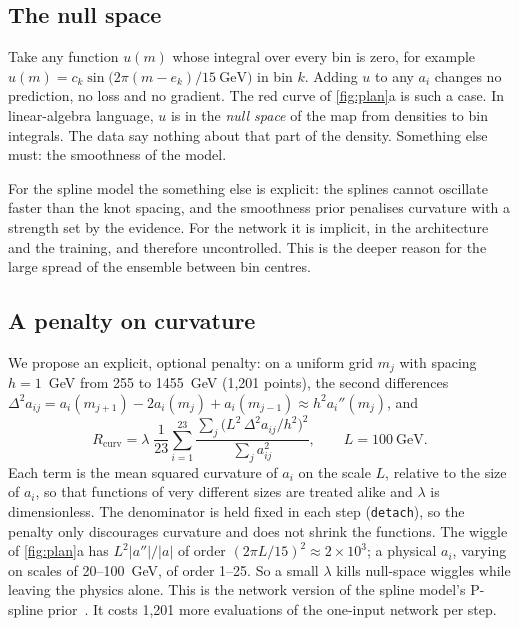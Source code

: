 \documentclass[11pt]{article}
\newcommand{\code}[1]{\texttt{#1}}
\begin{document}
\subsection{The null space}

Take any function $u(m)$ whose integral over every bin is zero, for example
$u(m) = c_k\sin\!\big(2\pi(m-e_k)/15~\text{GeV}\big)$ in bin $k$. Adding $u$ to any $a_i$ changes
no prediction, no loss and no gradient. The red curve of \cref{fig:plan}a is such a case.
In linear-algebra language, $u$ is in the \emph{null space} of the map from densities to bin
integrals. The data say nothing about that part of the density. Something else must: the
smoothness of the model.

For the spline model the something else is explicit: the splines cannot oscillate faster than the
knot spacing, and the smoothness prior penalises curvature with a strength set by the evidence.
For the network it is implicit, in the architecture and the training, and therefore
uncontrolled. This is the deeper reason for the large spread of the ensemble between bin centres.

\subsection{A penalty on curvature}

We propose an explicit, optional penalty: on a uniform grid $m_j$ with spacing $h = 1$~GeV from
255 to 1455~GeV (1,201 points), the second differences
$\Delta^2 a_{ij} = a_i(m_{j+1}) - 2a_i(m_j) + a_i(m_{j-1}) \approx h^2 a_i''(m_j)$, and
\begin{equation}
  R_\text{curv} = \lambda\;\frac{1}{23}\sum_{i=1}^{23}
  \frac{\sum_j \big(L^2\,\Delta^2 a_{ij}/h^2\big)^2}{\sum_j a_{ij}^2},
  \qquad L = 100~\text{GeV}.
  \label{eq:curv}
\end{equation}
Each term is the mean squared curvature of $a_i$ on the scale $L$, relative to the size of $a_i$,
so that functions of very different sizes are treated alike and $\lambda$ is dimensionless. The
denominator is held fixed in each step (\code{detach}), so the penalty only discourages
curvature and does not shrink the functions. The wiggle of \cref{fig:plan}a has $L^2|a''|/|a|$ of
order $(2\pi L/15)^2 \approx 2\times10^3$; a physical $a_i$, varying on scales of 20--100~GeV, of
order 1--25. So a small $\lambda$ kills null-space wiggles while leaving the physics alone. This
is the network version of the spline model's P-spline prior~\cite{eilers96}. It costs 1,201
more evaluations of the one-input network per step.
\end{document}
